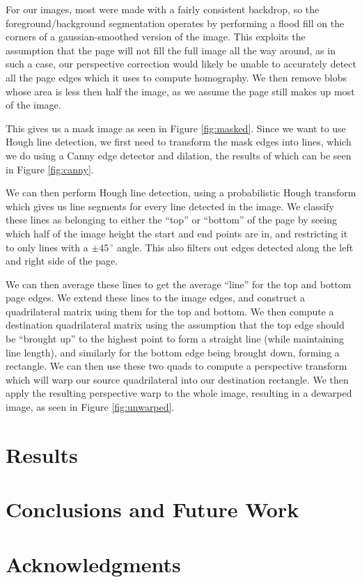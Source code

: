\documentclass[runningheads,a4paper]{llncs}
\begin{document}
For our images, most were made with a fairly consistent backdrop, so the foreground/background segmentation operates by performing a flood fill on the corners of a gaussian-smoothed version of the image. This exploits the assumption that the page will not fill the full image all the way around, as in such a case, our perspective correction would likely be unable to accurately detect all the page edges which it uses to compute homography. We then remove blobs whose area is less then half the image, as we assume the page still makes up most of the image. 

This gives us a mask image as seen in Figure \ref{fig:masked}. Since we want to use Hough line detection, we first need to transform the mask edges into lines, which we do using a Canny edge detector and dilation, the results of which can be seen in Figure \ref{fig:canny}.

We can then perform Hough line detection, using a probabilistic Hough transform which gives us line segments for every line detected in the image. We classify these lines as belonging to either the “top” or “bottom” of the page by seeing which half of the image height the start and end points are in, and restricting it to only lines with a $\pm 45\,^{\circ}$ angle. This also filters out edges detected along the left and right side of the page.

We can then average these lines to get the average “line” for the top and bottom page edges. We extend these lines to the image edges, and construct a quadrilateral matrix using them for the top and bottom. We then compute a destination quadrilateral matrix using the assumption that the top edge should be “brought up” to the highest point to form a straight line (while maintaining line length), and similarly for the bottom edge being brought down, forming a rectangle. We can then use these two quads to compute a perspective transform which will warp our source quadrilateral into our destination rectangle. We then apply the resulting perspective warp to the whole image, resulting in a dewarped image, as seen in Figure \ref{fig:unwarped}.

\section{Results}

\section{Conclusions and Future Work}

\section{Acknowledgments}



\end{document}
